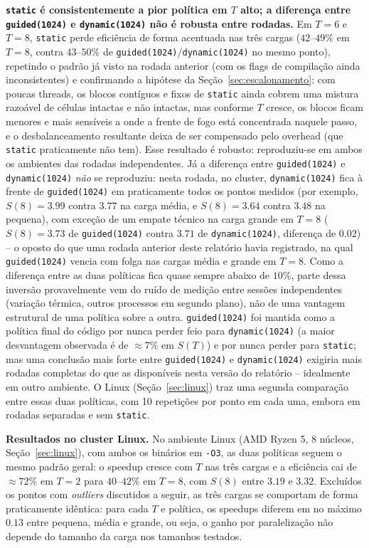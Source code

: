 \documentclass[12pt,a4paper]{article}
\begin{document}
\textbf{\texttt{static} é consistentemente a pior política em $T$ alto;
a diferença entre \texttt{guided(1024)} e \texttt{dynamic(1024)} não é
robusta entre rodadas.} Em $T=6$ e $T=8$, \texttt{static} perde
eficiência de forma acentuada nas três cargas ($42$--$49\%$ em $T=8$,
contra $43$--$50\%$ de \texttt{guided(1024)}/\texttt{dynamic(1024)} no
mesmo ponto), repetindo o padrão já visto na rodada anterior (com os
flags de compilação ainda inconsistentes) e confirmando a hipótese da
Seção~\ref{sec:escalonamento}: com poucas threads, os blocos contíguos e
fixos de \texttt{static} ainda cobrem uma mistura razoável de células
intactas e não intactas, mas conforme $T$ cresce, os blocos ficam
menores e mais sensíveis a onde a frente de fogo está concentrada
naquele passo, e o desbalanceamento resultante deixa de ser compensado
pelo overhead (que \texttt{static} praticamente não tem). Esse resultado
é robusto: reproduziu-se em ambos os ambientes das rodadas independentes. Já a diferença
entre \texttt{guided(1024)} e \texttt{dynamic(1024)} \emph{não} se
reproduziu: nesta rodada, no cluster, \texttt{dynamic(1024)} fica à frente de
\texttt{guided(1024)} em praticamente todos os pontos medidos (por
exemplo, $S(8)=3.99$ contra $3.77$ na carga média, e $S(8)=3.64$ contra
$3.48$ na pequena), com exceção de um empate técnico na carga grande em
$T=8$ ($S(8)=3.73$ de \texttt{guided(1024)} contra $3.71$ de
\texttt{dynamic(1024)}, diferença de $0.02$) -- o oposto do que uma
rodada anterior deste relatório havia registrado, na qual
\texttt{guided(1024)} vencia com folga nas cargas média e grande em
$T=8$. Como a diferença entre as duas políticas fica quase sempre abaixo
de $10\%$, parte dessa inversão provavelmente vem do ruído de medição
entre sessões independentes (variação térmica, outros processos em
segundo plano), não de uma vantagem estrutural de uma política sobre a
outra. \texttt{guided(1024)} foi mantida como a política final do código
por nunca perder feio para \texttt{dynamic(1024)} (a maior desvantagem
observada é de $\approx\!7\%$ em $S(T)$) e por nunca perder para
\texttt{static}; mas uma conclusão mais forte entre
\texttt{guided(1024)} e \texttt{dynamic(1024)} exigiria mais rodadas
completas do que as disponíveis nesta versão do relatório --
idealmente em outro ambiente. O Linux (Seção~\ref{sec:linux}) traz uma
segunda comparação entre essas duas políticas, com 10 repetições por
ponto em cada uma, embora em rodadas separadas e sem \texttt{static}.


\textbf{Resultados no cluster Linux.} No ambiente Linux (AMD Ryzen 5, 8
núcleos, Seção~\ref{sec:linux}), com ambos os binários em \texttt{-O3},
as duas políticas seguem o mesmo padrão geral: o speedup cresce com $T$
nas três cargas e a eficiência cai de $\approx\!72\%$ em $T=2$ para
$40$--$42\%$ em $T=8$, com $S(8)$ entre $3.19$ e $3.32$. Excluídos os
pontos com \emph{outliers} discutidos a seguir, as três cargas se
comportam de forma praticamente idêntica: para cada $T$ e política, os
speedups diferem em no máximo $0.13$ entre pequena, média e grande, ou
seja, o ganho por paralelização não depende do tamanho da carga nos
tamanhos testados.
\end{document}
